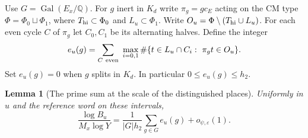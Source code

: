 \documentclass[a4paper,11pt]{article}
\newtheorem{lemma}[proposition]{Lemma}
\theoremstyle{definition}
\theoremstyle{remark}
\numberwithin{equation}{section}
\begin{document}
Use \(G=\operatorname{Gal}(E_x/\mathbb Q)\).
For \(g\) inert in \(K_d\) write \(\pi_g=gc_E\) acting on the
CM type \(\Phi=\Phi_0\sqcup\Phi_1\), where
\(T_{\rm hi}\subset\Phi_0\) and \(L_u\subset\Phi_1\).
Write \(O_u=\Phi\setminus(T_{\rm hi}\cup L_u)\).
For each even cycle \(C\) of \(\pi_g\) let \(C_0,C_1\) be its
alternating halves. Define the integer
\[
 e_u(g)=\sum_{C\ {\rm even}}\ \max_{i=0,1}
    \#\{t\in L_u\cap C_i:\ \pi_g t\in O_u\}.
\]
Set \(e_u(g)=0\) when \(g\) splits in \(K_d\). In particular
\(0\le e_u(g)\le h_2\).

\begin{lemma}[The prime sum at the scale of the distinguished places]\leavevmode
\label{lem:divmean513}
Uniformly in \(u\) and the reference word on these intervals,
\[
       \frac{\log B_u}{M_x\log Y}
       =\frac1{|G|h_2}\sum_{g\in G} e_u(g)
                                      +o_{\psi,\varepsilon}(1).
\]
\end{lemma}
\end{document}
